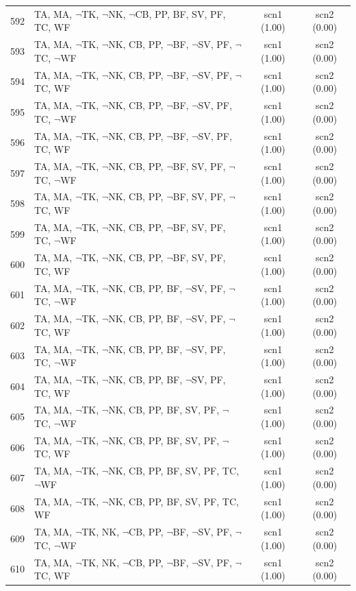 \documentclass[12pt]{article}
\begin{document}
\begin{longtable}{|l|l|c|c|}
592 & TA, MA, $\neg$TK, $\neg$NK, $\neg$CB, PP, BF, SV, PF, TC, WF & scn1 (1.00) & scn2 (0.00)\\
593 & TA, MA, $\neg$TK, $\neg$NK, CB, PP, $\neg$BF, $\neg$SV, PF, $\neg$TC, $\neg$WF & scn1 (1.00) & scn2 (0.00)\\
594 & TA, MA, $\neg$TK, $\neg$NK, CB, PP, $\neg$BF, $\neg$SV, PF, $\neg$TC, WF & scn1 (1.00) & scn2 (0.00)\\
595 & TA, MA, $\neg$TK, $\neg$NK, CB, PP, $\neg$BF, $\neg$SV, PF, TC, $\neg$WF & scn1 (1.00) & scn2 (0.00)\\
596 & TA, MA, $\neg$TK, $\neg$NK, CB, PP, $\neg$BF, $\neg$SV, PF, TC, WF & scn1 (1.00) & scn2 (0.00)\\
597 & TA, MA, $\neg$TK, $\neg$NK, CB, PP, $\neg$BF, SV, PF, $\neg$TC, $\neg$WF & scn1 (1.00) & scn2 (0.00)\\
598 & TA, MA, $\neg$TK, $\neg$NK, CB, PP, $\neg$BF, SV, PF, $\neg$TC, WF & scn1 (1.00) & scn2 (0.00)\\
599 & TA, MA, $\neg$TK, $\neg$NK, CB, PP, $\neg$BF, SV, PF, TC, $\neg$WF & scn1 (1.00) & scn2 (0.00)\\
600 & TA, MA, $\neg$TK, $\neg$NK, CB, PP, $\neg$BF, SV, PF, TC, WF & scn1 (1.00) & scn2 (0.00)\\
601 & TA, MA, $\neg$TK, $\neg$NK, CB, PP, BF, $\neg$SV, PF, $\neg$TC, $\neg$WF & scn1 (1.00) & scn2 (0.00)\\
602 & TA, MA, $\neg$TK, $\neg$NK, CB, PP, BF, $\neg$SV, PF, $\neg$TC, WF & scn1 (1.00) & scn2 (0.00)\\
603 & TA, MA, $\neg$TK, $\neg$NK, CB, PP, BF, $\neg$SV, PF, TC, $\neg$WF & scn1 (1.00) & scn2 (0.00)\\
604 & TA, MA, $\neg$TK, $\neg$NK, CB, PP, BF, $\neg$SV, PF, TC, WF & scn1 (1.00) & scn2 (0.00)\\
605 & TA, MA, $\neg$TK, $\neg$NK, CB, PP, BF, SV, PF, $\neg$TC, $\neg$WF & scn1 (1.00) & scn2 (0.00)\\
606 & TA, MA, $\neg$TK, $\neg$NK, CB, PP, BF, SV, PF, $\neg$TC, WF & scn1 (1.00) & scn2 (0.00)\\
607 & TA, MA, $\neg$TK, $\neg$NK, CB, PP, BF, SV, PF, TC, $\neg$WF & scn1 (1.00) & scn2 (0.00)\\
608 & TA, MA, $\neg$TK, $\neg$NK, CB, PP, BF, SV, PF, TC, WF & scn1 (1.00) & scn2 (0.00)\\
609 & TA, MA, $\neg$TK, NK, $\neg$CB, PP, $\neg$BF, $\neg$SV, PF, $\neg$TC, $\neg$WF & scn1 (1.00) & scn2 (0.00)\\
610 & TA, MA, $\neg$TK, NK, $\neg$CB, PP, $\neg$BF, $\neg$SV, PF, $\neg$TC, WF & scn1 (1.00) & scn2 (0.00)\\

\end{longtable}
\end{document}
